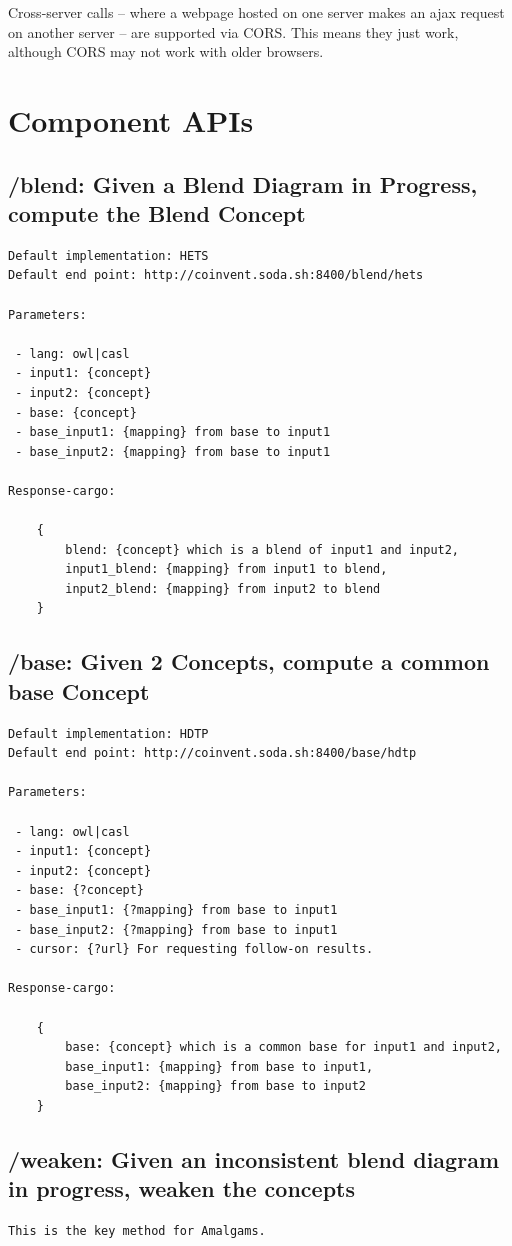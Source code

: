 \documentclass[10pt]{article}
\begin{document}
\begin{appendices}
Cross-server calls -- where a webpage hosted on one server makes an ajax request
on another server -- are supported via CORS. This means they just work, although CORS may not work with older browsers.

\section{Component APIs}

\subsection{/blend: Given a Blend Diagram in Progress, compute the Blend Concept}
\begin{verbatim}
Default implementation: HETS   
Default end point: http://coinvent.soda.sh:8400/blend/hets

Parameters:

 - lang: owl|casl
 - input1: {concept} 
 - input2: {concept}
 - base: {concept}
 - base_input1: {mapping} from base to input1
 - base_input2: {mapping} from base to input1
  
Response-cargo: 
	
	{
		blend: {concept} which is a blend of input1 and input2,
		input1_blend: {mapping} from input1 to blend,
		input2_blend: {mapping} from input2 to blend
	}
\end{verbatim}
\subsection{/base: Given 2 Concepts, compute a common base Concept}
\begin{verbatim}
Default implementation: HDTP   
Default end point: http://coinvent.soda.sh:8400/base/hdtp

Parameters:

 - lang: owl|casl
 - input1: {concept} 
 - input2: {concept}
 - base: {?concept}
 - base_input1: {?mapping} from base to input1
 - base_input2: {?mapping} from base to input1
 - cursor: {?url} For requesting follow-on results.
 
Response-cargo: 
	
	{
		base: {concept} which is a common base for input1 and input2,
		base_input1: {mapping} from base to input1,
		base_input2: {mapping} from base to input2
	}

\end{verbatim}
\subsection{/weaken: Given an inconsistent blend diagram in progress, weaken the concepts}
\begin{verbatim}
This is the key method for Amalgams.


\end{verbatim}
\end{appendices}
\end{document}
